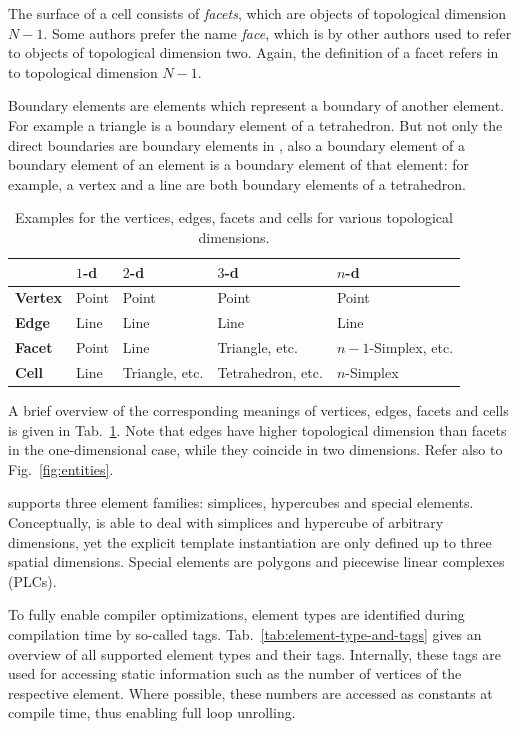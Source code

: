 The surface of a cell consists of \emph{facets}, which are objects of topological dimension $N-1$.
Some authors prefer the name \emph{face}, which is by other authors used to refer to objects of topological dimension two.
Again, the definition of a facet refers in {\ViennaGrid} to topological dimension $N-1$.

Boundary elements are elements which represent a boundary of another element.
For example a triangle is a boundary element of a tetrahedron.
But not only the direct boundaries are boundary elements in {\ViennaGrid}, also a boundary element of a boundary element of an element is a boundary element of that element:
for example, a vertex and a line are both boundary elements of a tetrahedron.

\begin{table}[tbp]
 \centering
 \renewcommand{\arraystretch}{1.3}
\begin{tabular}{|l|l|l|l|l|}
\hline
          &  $1$-d & $2$-d & $3$-d & $n$-d \\
\hline
 \textbf{Vertex}   & Point  & Point & Point & Point \\
 \textbf{Edge}     & Line   & Line  & Line  & Line \\
 \textbf{Facet}   & Point  & Line  & Triangle, etc. & $n-1$-Simplex, etc. \\
 \textbf{Cell}   & Line   & Triangle, etc. & Tetrahedron, etc. & $n$-Simplex \\
\hline
\end{tabular}
\caption{Examples for the vertices, edges, facets and cells for various topological dimensions.}
\label{tab:vertex-edge-facet-cell}
\end{table}

A brief overview of the corresponding meanings of vertices, edges, facets and cells is given in Tab.~\ref{tab:vertex-edge-facet-cell}. Note that edges have higher topological dimension than facets in the one-dimensional case, while they coincide in two dimensions. Refer also to Fig.~\ref{fig:entities}.

{\ViennaGrid} supports three element families: simplices, hypercubes and special elements.
Conceptually, {\ViennaGrid} is able to deal with simplices and hypercube of arbitrary dimensions,
yet the explicit template instantiation are only defined up to three spatial dimensions.
Special elements are polygons and piecewise linear complexes (PLCs).

To fully enable compiler optimizations, element types are identified during compilation time by so-called tags.
Tab.~\ref{tab:element-type-and-tags} gives an overview of all supported element types and their tags.
Internally, these tags are used for accessing static information such as the number of vertices of the respective element.
Where possible, these numbers are accessed as constants at compile time, thus enabling full loop unrolling.

